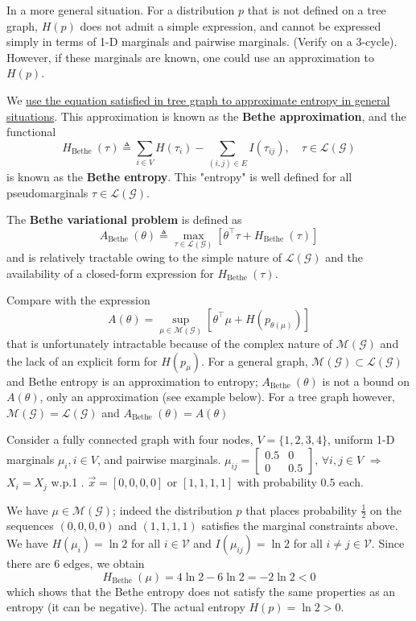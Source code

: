 \documentclass[11pt]{elegantbook}
\begin{document}
In a more general situation. For a distribution $p$ that is not defined on a tree graph, $H(p)$ does not admit a simple expression, and cannot be expressed simply in terms of 1-D marginals and pairwise marginals. (Verify on a 3-cycle). However, if these marginals are known, one could use an approximation to $H(p)$.
\begin{definition}
    We \underline{use the equation satisfied in tree graph to approximate entropy in general situations}. This approximation is known as the \textbf{Bethe approximation}, and the functional
    $$
    H_{\text {Bethe }}(\tau) \triangleq \sum_{i \in V} H\left(\tau_i\right)-\sum_{(i, j) \in E} I\left(\tau_{i j}\right), \quad \tau \in \mathcal{L}(\mathcal{G})
    $$
    is known as the \textbf{Bethe entropy}. This "entropy" is well defined for all pseudomarginals $\tau \in \mathcal{L}(\mathcal{G})$.

    The \textbf{Bethe variational problem} is defined as
    $$
    A_{\text {Bethe }}(\theta) \triangleq \max _{\tau \in \mathcal{L}(\mathcal{G})}\left[\theta^{\top} \tau+H_{\text {Bethe }}(\tau)\right]
    $$
    and is relatively tractable owing to the simple nature of $\mathcal{L}(\mathcal{G})$ and the availability of a closed-form expression for $H_{\text {Bethe }}(\tau)$.
\end{definition}
Compare with the expression
$$
A(\theta)=\sup _{\mu \in \mathcal{M}(\mathcal{G})}\left[\theta^{\top} \mu+H\left(p_{\theta(\mu)}\right)\right]
$$
that is unfortunately intractable because of the complex nature of $\mathcal{M}(\mathcal{G})$ and the lack of an explicit form for $H\left(p_\mu\right)$. For a general graph, $\mathcal{M}(\mathcal{G}) \subset \mathcal{L}(\mathcal{G})$ and Bethe entropy is an approximation to entropy; $A_{\text {Bethe }}(\theta)$ is not a bound on $A(\theta)$, only an approximation (see example below). For a tree graph however, $\mathcal{M}(\mathcal{G})=\mathcal{L}(\mathcal{G})$ and $A_{\text {Bethe }}(\theta)=A(\theta)$

\begin{example}
    Consider a fully connected graph with four nodes, $V = \{1, 2, 3, 4\}$, uniform 1-D marginals $\mu_i, i \in V$, and pairwise marginals. $\mu_{ij}=\begin{bmatrix}
        0.5&0\\
        0&0.5
    \end{bmatrix}$, $\forall i,j\in V$ $\Rightarrow$ $X_i=X_j$ w.p.1 . $\vec{x}=[0,0,0,0]$ or $[1,1,1,1]$ with probability $0.5$ each.
    
    We have $\mu \in \mathcal{M}(\mathcal{G})$; indeed the distribution $p$ that places probability $\frac{1}{2}$ on the sequences $(0,0,0,0)$ and $(1,1,1,1)$ satisfies the marginal constraints above. We have $H\left(\mu_i\right)=\ln 2$ for all $i \in \mathcal{V}$ and $I\left(\mu_{i j}\right)=\ln 2$ for all $i \neq j \in \mathcal{V}$. Since there are 6 edges, we obtain
    $$
    H_{\text {Bethe }}(\mu)=4 \ln 2-6 \ln 2=-2 \ln 2<0
    $$
    which shows that the Bethe entropy does not satisfy the same properties as an entropy (it can be negative). The actual entropy $H(p) = \ln 2 > 0$.
\end{example}
\end{document}
